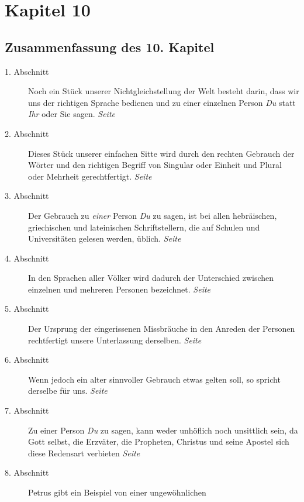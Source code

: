 
\chapter{Kapitel 10} \label{kap10}
\section{Zusammenfassung des 10. Kapitel}


\begin{description}
\item[1. Abschnitt] Noch ein Stück unserer Nichtgleichstellung der Welt besteht
darin, dass wir uns der richtigen Sprache bedienen und zu einer einzelnen Person
\textit{Du} statt \textit{Ihr} oder Sie sagen.
\dotfill \textit{Seite~\pageref{kap10_ab1}}\\
\item[2. Abschnitt] Dieses Stück unserer einfachen Sitte wird durch den rechten
Gebrauch der Wörter und den richtigen Begriff von Singular oder Einheit und
Plural oder Mehrheit gerechtfertigt.
\dotfill \textit{Seite~\pageref{kap10_ab2}}\\
\item[3. Abschnitt] Der Gebrauch zu \textit{einer} Person \textit{Du} zu sagen,
ist bei
allen hebräischen, griechischen und lateinischen Schriftstellern, die auf
Schulen und Universitäten gelesen werden, üblich.
\dotfill \textit{Seite~\pageref{kap10_ab3}}\\
\item[4. Abschnitt] In den Sprachen aller Völker wird dadurch der Unterschied
zwischen einzelnen und mehreren Personen bezeichnet.
\dotfill \textit{Seite~\pageref{kap10_ab4}}\\
\item[5. Abschnitt] Der Ursprung der eingerissenen Missbräuche in den Anreden
der
Personen rechtfertigt unsere Unterlassung derselben.
\dotfill \textit{Seite~\pageref{kap10_ab5}}\\
\item[6. Abschnitt] Wenn jedoch ein alter sinnvoller Gebrauch etwas gelten
soll, so spricht derselbe für uns.
\dotfill \textit{Seite~\pageref{kap10_ab6}}\\
\item[7. Abschnitt] Zu einer Person \textit{Du} zu sagen, kann weder unhöflich
noch
unsittlich sein, da Gott selbst, die Erzväter, die Propheten, Christus und
seine Apostel sich diese Redensart verbieten
\dotfill \textit{Seite~\pageref{kap10_ab7}}\\
\item[8. Abschnitt] Petrus gibt ein Beispiel von einer ungewöhnlichen

\end{description}
